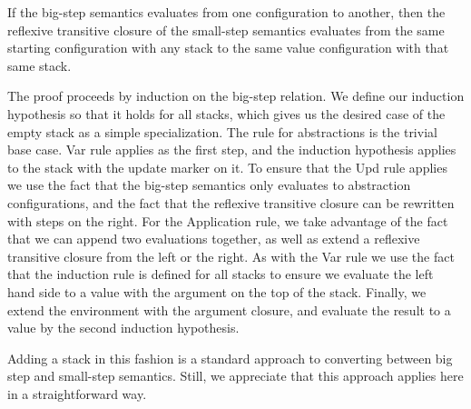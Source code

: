 \begin{lemma}
If the big-step semantics evaluates from one configuration to another, then the
reflexive transitive closure of the small-step semantics evaluates from the same
starting configuration with any stack to the same value configuration with that
same stack.
\end{lemma}
\begin{proofoutline}
The proof proceeds by induction on the big-step relation. We define our
induction hypothesis so that it holds for all stacks, which gives us the
desired case of the empty stack as a simple specialization. The rule for
abstractions is the trivial base case. Var rule applies as the first step, and
the induction hypothesis applies to the stack with the update marker on it. To
ensure that the Upd rule applies we use the fact that the big-step semantics
only evaluates to abstraction configurations, and the fact that the reflexive
transitive closure can be rewritten with steps on the right. For the Application
rule, we take advantage of the fact that we can append two evaluations together,
as well as extend a reflexive transitive closure from the left or the right. As
with the Var rule we use the fact that the induction rule is defined for all
stacks to ensure we evaluate the left hand side to a value with the argument on
the top of the stack.  Finally, we extend the environment with the argument
closure, and evaluate the result to a value by the second induction hypothesis.
\end{proofoutline}

Adding a stack in this fashion is a standard approach to converting between big
step and small-step semantics. Still, we appreciate that this approach applies
here in a straightforward way. 
